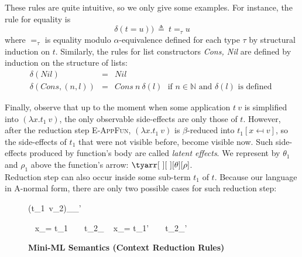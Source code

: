 \documentclass[a4paper,11pt,oneside]{article}
\theoremstyle{plain}
\newcommand{\mem}{_{\mu}}\newcommand{\memp}{_{\mu'}}
\begin{document}
	These rules are quite intuitive, so we only give some examples.
	For instance, the rule for equality is 
   $$\delta(t \mathtt{=} u))~\triangleq~t =_{\tau} u $$	
	where $=_\tau$ is equality modulo $\alpha$-equivalence defined for each type $\tau$ by structural induction on $t$.
	Similarly, the rules for list constructors \textit{Cons, Nil} are defined by induction on the structure of lists: 
	\begin{displaymath}
	\begin{array}{lll}

	\delta(Nil) &=& Nil \\
	\delta(Cons, (n, l)) &=& Cons~n~\delta(l)~~~ \text{if } n \in \mathbb{N} \text{ and } \delta(l) \text{ is defined } 
	\end{array}
	\end{displaymath}

Finally, observe that up to the moment when some application $t~v$ is simplified into $(\lambda x. t_1 ~ v)$, the only observable side-effects are only those of $t$. However, after the reduction step \textsc{E-AppFun}, $(\lambda x. t_1 ~ v)$ is $\beta$-reduced into $t_1[x \mapsfrom v]$, so the side-effects of $t_1$ that were not visible before, become visible now. Such side-effects produced by function's body are called \textit{latent effects}. We represent by $\theta_1$ and $\rho_1$ above the function's arrow: $\tyarr[~][~][\theta][\rho]$. \\

	Reduction step can also occur inside some sub-term $t_1$ of $t$. 
	Because our language in A-normal form, there are only two possible cases for such reduction step: 
	\begin{figure}[H]
	\begin{small}
	\begin{spacing}{1.2} 	
	\begin{adjustwidth}{-6em}{-6em}
	\begin{minipage}[t]{0.41\linewidth}
	\infrule[E-App-T]	
	{{t_{1}}\mem \rightarrow {{t'}_{1}}\memp}
	{{(t_{1}~v_2)}\mem {}\memp}
	\end{minipage}
	\begin{minipage}[t]{0.45\linewidth}
	\infrule[E-Let-T]
	{{t_{1}}\mem \rightarrow {{t'}_{1}}\memp}
	{ ~ x_\tau = t_{1} ~ ~ {t_{2}}\mem
		\rightarrow 
		 ~ x_\tau = t_{1}' ~ ~ {t_{2}}\memp}
 \end{minipage}
 \end{adjustwidth}
\end{spacing}
\end{small}
\caption{ \textbf{Mini-ML Semantics (Context Reduction Rules)} \hfill}
\label{mini-ml-def-sem}
\end{figure}
\end{document}
